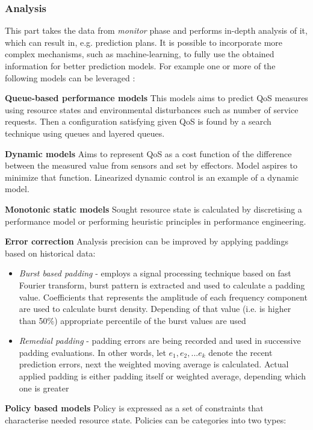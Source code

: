 \subsubsection{Analysis}
This part takes the data from \emph{monitor} phase and performs in-depth analysis of it, which can result in, e.g. prediction plans. It is possible to incorporate more complex mechanisms, such as machine-learning, to fully use the obtained information for better prediction models. For example one or more of the following models can be leveraged \cite{LiWoZh05}:
\begin{asparaenum}
 \item[\textbf{Queue-based performance models}] This models aims to predict QoS measures using resource states and environmental disturbances such as number of service requests. Then a configuration satisfying given QoS is found by a search technique using queues and layered queues. 
 \item[\textbf{Dynamic models}] Aims to represent QoS as a cost function of the difference between the measured value from sensors and set by effectors. Model aspires to minimize that function. Linearized dynamic control is an example of a dynamic model. 
 \item[\textbf{Monotonic static models}] Sought resource state is calculated by discretising a performance model or performing heuristic principles in performance engineering. 
 \item[\textbf{Error correction}] Analysis precision can be improved by applying paddings based on historical data:
    \begin{itemize}
      \item \textit{Burst based padding} - employs a signal processing technique based on fast Fourier transform, burst pattern is extracted and used to calculate a padding value. Coefficients that represents the amplitude of each frequency component are used to calculate burst density. Depending of that value (i.e. is higher than 50\%) appropriate percentile of the burst values are used \cite{ShSuGuWi11}  
      \item \textit{Remedial padding} - padding errors are being recorded and used in successive padding evaluations. In other words, let $e_1, e_2, ... e_k$ denote the recent prediction errors, next the weighted moving average is calculated. Actual applied padding is either padding itself or weighted average, depending which one is greater \cite{ShSuGuWi11}    
    \end{itemize}
 \item[\textbf{Policy based models}] Policy is expressed as a set of constraints that characterise needed resource state. Policies can be categories into two types:

\end{asparaenum}
